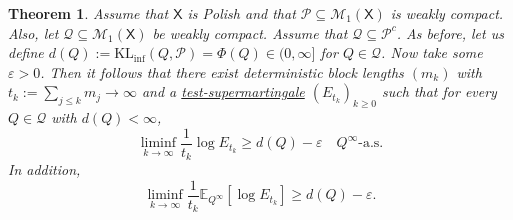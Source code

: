 \documentclass[11pt]{article}
\newcommand{\KLinf}{\mathrm{KL}_{\mathrm{inf}}}
\newcommand{\E}{\mathbb{E}}
\newcommand{\Pcal}{\mathcal{P}}
\newcommand{\Qcal}{\mathcal{Q}}
\newcommand{\X}{\mathsf{X}}
\newtheorem{theorem}{Theorem}[section]
\theoremstyle{definition}
\theoremstyle{definition}
\begin{document}
\begin{theorem}\label{thm:cover-and-mix-eprocess}
Assume that $\X$ is Polish and that $\Pcal\subseteq\mathcal M_1(\X)$ is weakly compact. Also, let $\Qcal\subseteq\mathcal M_1(\X)$ be weakly compact. Assume that $\Qcal\subseteq\Pcal^c$. As before, let us define $d(Q):=\KLinf(Q,\Pcal)=\Phi(Q)\in(0,\infty]$ for $Q\in\Qcal$. Now take some $\varepsilon>0$. Then it follows that there exist deterministic block lengths $(m_k)$ with $t_k:=\sum_{j\le k}m_j\to\infty$ and a \underline{test-supermartingale} $(E_{t_k})_{k\ge 0}$ such that for every $Q\in\Qcal$ with $d(Q)<\infty$,
\[
\boxed{
\liminf_{k\to\infty}\frac{1}{t_k}\log E_{t_k} \ge d(Q)-\varepsilon \quad Q^\infty\text{-a.s.}
}
\]
In addition,
\[
\boxed{
\liminf_{k\to\infty}\frac{1}{t_k}\E_{Q^\infty}[\log E_{t_k}] \ge d(Q)-\varepsilon.
}
\]
\end{theorem}
\end{document}
